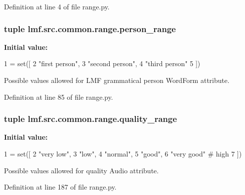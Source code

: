 Definition at line 4 of file range.\+py.

\hypertarget{namespacelmf_1_1src_1_1common_1_1range_ad711c6c7c0e62384f61b106ec7bf2af0}{
\subsubsection[{person\+\_\+range}]{\setlength{\rightskip}{0pt plus 5cm}tuple lmf.\+src.\+common.\+range.\+person\+\_\+range}}\label{namespacelmf_1_1src_1_1common_1_1range_ad711c6c7c0e62384f61b106ec7bf2af0}
{\bfseries Initial value\+:}
\begin{DoxyCode}
1 = set([
2     \textcolor{stringliteral}{"first person"},
3     \textcolor{stringliteral}{"second person"},
4     \textcolor{stringliteral}{"third person"}
5 ])
\end{DoxyCode}


Possible values allowed for L\+M\+F grammatical person Word\+Form attribute. 



Definition at line 85 of file range.\+py.

\hypertarget{namespacelmf_1_1src_1_1common_1_1range_a6aef6275dfffea6c0ebf4f105ae35b64}{
\subsubsection[{quality\+\_\+range}]{\setlength{\rightskip}{0pt plus 5cm}tuple lmf.\+src.\+common.\+range.\+quality\+\_\+range}}\label{namespacelmf_1_1src_1_1common_1_1range_a6aef6275dfffea6c0ebf4f105ae35b64}
{\bfseries Initial value\+:}
\begin{DoxyCode}
1 = set([
2     \textcolor{stringliteral}{"very low"},
3     \textcolor{stringliteral}{"low"},
4     \textcolor{stringliteral}{"normal"},
5     \textcolor{stringliteral}{"good"},
6     \textcolor{stringliteral}{"very good"} \textcolor{comment}{# high}
7 ])
\end{DoxyCode}


Possible values allowed for quality Audio attribute. 



Definition at line 187 of file range.\+py.

